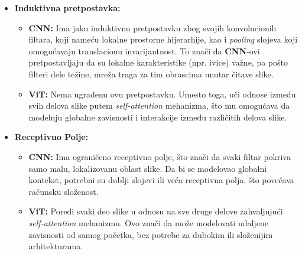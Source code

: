 \documentclass[12pt]{article}
\begin{document}
   \begin{itemize}
      \item \textbf{Induktivna pretpostavka:}
      \begin{itemize}
         \item \textbf{CNN:} Ima jaku induktivnu pretpostavku zbog svojih konvolucionih filtara, 
         koji nameću lokalne prostorne hijerarhije, kao i \textit{pooling} slojeva
         koji omogućavaju translacionu invarijantnost. To znači 
         da \textbf{CNN}-ovi pretpostavljaju da su lokalne karakteristike (npr. ivice) važne, pa pošto
         filteri dele težine, mreža traga za tim obrascima unutar čitave slike.
         \item \textbf{ViT:} Nema ugrađenu ovu pretpostavku. Umesto toga, uči 
         odnose između svih delova slike putem \textit{self-attention} mehanizma, što mu 
         omogućava da modeluju globalne zavisnosti i interakcije između različitih delova slike.
      \end{itemize}
      \item \textbf{Receptivno Polje:}
      \begin{itemize}
         \item \textbf{CNN:} Ima ograničeno receptivno polje, što znači da svaki filtar pokriva 
         samo malu, lokalizovanu oblast slike. Da bi se modelovao globalni kontekst, potrebni su 
         dublji slojevi ili veća receptivna polja, što povećava računsku složenost.
         \item \textbf{ViT:} Poredi svaki deo slike u odnosu na sve druge delove zahvaljujući
         \textit{self-attention} mehanizmu. Ovo znači da može modelovati udaljene zavisnosti od 
         samog početka, bez potrebe za dubokim ili složenijim arhitekturama.
      \end{itemize}
   \end{itemize}
\end{document}
